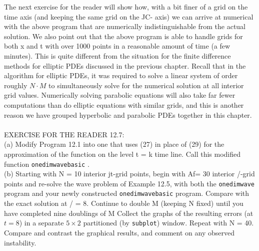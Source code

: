 \documentclass[../main.tex]{subfiles}
\begin{document}
The next exercise for the reader will show how, with a bit finer of a grid on the time axis (and keeping the same grid on the JC- axis) we can arrive at numerical  with the above program that are numerically indistinguishable from the actual solution. We also point out that the above program is able to handle grids for both x and t with over 1000 points in a reasonable amount of time (a few minutes). This is quite different from the situation for the finite difference methods for elliptic PDEs discussed in the previous chapter. Recall that in the algorithm for elliptic PDEs, it was required to solve a linear system of order roughly $N \cdot M$ to simultaneously solve for the numerical solution at all interior grid values. Numerically solving parabolic equations will also take far fewer computations than do elliptic equations with similar grids, and this is another reason we have grouped hyperbolic and parabolic PDEs together in this chapter. 
\\
\\
EXERCISE FOR THE READER 12.7: 
\\
(a) Modify Program 12.1 into one that uses (27) in place of (29) for the approximation of the function on the level t = k time line. Call this modified function \texttt{onedimwavebasic} . 
\\
(b) Starting with N = 10 interior jt-grid points, begin with Af= 30 interior /-grid points and re-solve the wave problem of Example 12.5, with both the \texttt{onedimwave} program and your newly constructed \texttt{onedimwavebasic} program. Compare with the exact solution at / = 8. Continue to double M (keeping N fixed) until you have completed nine doublings of M Collect the graphs of the resulting errors (at $t = 8$) in a separate $5\times 2$ partitioned (by \texttt{subplot}) window. Repeat with N = 40. Compare and contrast the graphical results, and comment on any observed instability. 
\\
\end{document}
